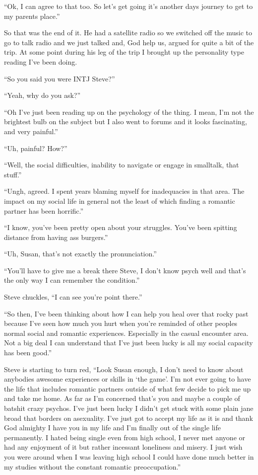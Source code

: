 ``Ok, I can agree to that too. So let's get going it's another days journey to get to my parents place.''

So that was the end of it. He had a satellite radio so we switched off the music to go to talk radio and we just talked and, God help us, argued for quite a bit of the trip. At some point during his leg of the trip I brought up the personality type reading I've been doing.

``So you said you were INTJ Steve?''

``Yeah, why do you ask?''

``Oh I've just been reading up on the psychology of the thing. I mean, I'm not the brightest bulb on the subject but I also went to forums and it looks fascinating, and very painful.''

``Uh, painful? How?''

``Well, the social difficulties, inability to navigate or engage in smalltalk, that stuff.''

``Ungh, agreed. I spent years blaming myself for inadequacies in that area. The impact on my social life in general not the least of which finding a romantic partner has been horrific.''

``I know, you've been pretty open about your struggles. You've been spitting distance from having ass burgers.''

``Uh, Susan, that's not exactly the pronunciation.''

``You'll have to give me a break there Steve, I don't know psych well and that's the only way I can remember the condition.''

Steve chuckles, ``I can see you're point there.''

``So then, I've been thinking about how I can help you heal over that rocky past because I've seen how much you hurt when you're reminded of other peoples normal social and romantic experiences. Especially in the casual encounter area. Not a big deal I can understand that I've just been lucky is all my social capacity has been good.''

Steve is starting to turn red, ``Look Susan enough, I don't need to know about anybodies awesome experiences or skills in `the game'. I'm not ever going to have the life that includes romantic partners outside of what few decide to pick me up and take me home. As far as I'm concerned that's you and maybe a couple of batshit crazy psychos. I've just been lucky I didn't get stuck with some plain jane broad that borders on asexuality. I've just got to accept my life as it is and thank God almighty I have you in my life and I'm finally out of the single life permanently. I hated being single even from high school, I never met anyone or had any enjoyment of it but rather incessant loneliness and misery. I just wish you were around when I was leaving high school I could have done much better in my studies without the constant romantic preoccupation.''

